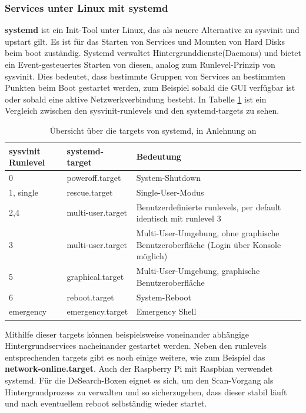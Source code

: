 \subsubsection{Services unter Linux mit systemd}\label{sssec:systemd}
\textbf{systemd} ist ein Init-Tool unter Linux, das als neuere Alternative zu sysvinit und upstart gilt. Es ist für das Starten von Services und Mounten von Hard Disks beim boot zuständig. Systemd verwaltet Hintergrunddienste(Daemons) und bietet ein Event-gesteuertes Starten von diesen, analog zum Runlevel-Prinzip von sysvinit. Dies bedeutet, dass bestimmte Gruppen von Services an bestimmten Punkten beim Boot gestartet werden, zum Beispiel sobald die GUI verfügbar ist oder sobald eine aktive Netzwerkverbindung besteht. In Tabelle \ref{tab:lvl} ist ein Vergleich zwischen den sysvinit-runlevels und den systemd-targets zu sehen. 
\begin{table}[h]
	\begin{tabular}{|p{}|p{} |p{} | }
		\hline
		\textbf{sysvinit Runlevel} & \textbf{systemd-target} & \textbf{Bedeutung}\\ \hline
		0 & poweroff.target & System-Shutdown	\\ \hline
		1, single & rescue.target & Single-User-Modus \\ \hline
		2,4 & multi-user.target & Benutzerdefinierte runlevels, per default identisch mit runlevel 3 \\ \hline
		3 & multi-user.target & Multi-User-Umgebung, ohne graphische Benutzer\-oberfläche (Login über Konsole möglich)\\ \hline
		5 & graphical.target & Multi-User-Umgebung, graphische Benutzer\-oberfläche \\ \hline
		6 & reboot.target & System-Reboot \\ \hline
		emergency & emergency.target & Emergency Shell\\ \hline
		
	\end{tabular}
	\caption[Übersicht über die targets von systemd]{Übersicht über die targets von systemd, in Anlehnung an \cite{fedora}}
	\label{tab:lvl}
\end{table}
Mithilfe dieser targets können beispielsweise voneinander abhängige Hintergrundservices nacheinander gestartet werden. Neben den runlevels entsprechenden targets gibt es noch einige weitere, wie zum Beispiel das \textbf{network-online.target}.
Auch der Raspberry Pi mit Raspbian verwendet systemd. Für die DeSearch-Boxen eignet es sich, um den Scan-Vorgang als Hintergrundprozess zu verwalten und so sicherzugehen, dass dieser stabil läuft und nach eventuellem reboot selbständig wieder startet.\newline
